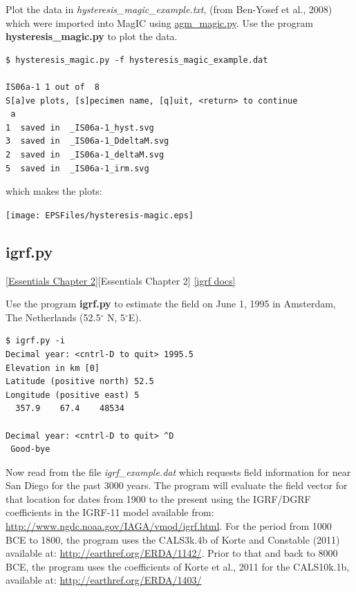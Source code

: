 \documentclass[11pt]{book}
\begin{document}
{{{{Plot the data in {\it hysteresis\_magic\_example.txt}, (from  Ben-Yosef et al., 2008) \nocite{benyosef08} which were imported into MagIC using  \href{#agm_magic.py}{agm\_magic.py}.   Use the program  {\bf hysteresis\_magic.py} to plot the data.

\begin{verbatim}
$ hysteresis_magic.py -f hysteresis_magic_example.dat

IS06a-1 1 out of  8
S[a]ve plots, [s]pecimen name, [q]uit, <return> to continue
 a
1  saved in  _IS06a-1_hyst.svg
3  saved in  _IS06a-1_DdeltaM.svg
2  saved in  _IS06a-1_deltaM.svg
5  saved in  _IS06a-1_irm.svg
\end{verbatim}

\noindent which makes the plots:


  \texttt{[image: EPSFiles/hysteresis-magic.eps]}




\subsection{igrf.py}
\href{http://earthref.org/MAGIC/books/Tauxe/Essentials/WebBook3ch2.html#ch2}{[Essentials Chapter 2]}[Essentials Chapter 2]
\href{https://github.com/PmagPy/PmagPy/blob/master/programs/igrf.py}{[igrf docs]}

Use the program {\bf igrf.py } to estimate the
field on June 1, 1995 in Amsterdam, The Netherlands (52.5$^{\circ}$ N, 5$^{\circ}$E).

\begin{verbatim}
$ igrf.py -i
Decimal year: <cntrl-D to quit> 1995.5
Elevation in km [0]
Latitude (positive north) 52.5
Longitude (positive east) 5
  357.9    67.4    48534

Decimal year: <cntrl-D to quit> ^D
 Good-bye
\end{verbatim}

Now read from the file {\it igrf\_example.dat} which requests field information for near San Diego for the past 3000 years.  The program will evaluate the field vector for that location for dates from 1900 to the present using the IGRF/DGRF coefficients in the IGRF-11 model available from:
\url{http://www.ngdc.noaa.gov/IAGA/vmod/igrf.html}.   For the period from 1000 BCE to 1800, the program uses the CALS3k.4b of Korte and Constable (2011) \nocite{korte11a} available at: \url{http://earthref.org/ERDA/1142/}.    Prior to that and back to 8000 BCE, the program uses the coefficients of Korte et al., 2011 \nocite{korte11b} for the CALS10k.1b, available at:
\url{http://earthref.org/ERDA/1403/}

}}}}
\end{document}
